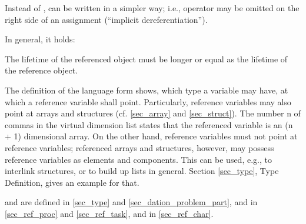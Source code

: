 Instead of , 
 can be written in a simpler way; i.e.,
operator  may be omitted on the right side of an assignment
(``implicit dereferentiation'').

In general, it holds:

\begin{grammarframe}
\end{grammarframe}

The lifetime of the referenced object must be longer or equal as
the lifetime of the reference object.

The definition of the language form  shows, which type a
variable may have, at which a reference variable shall point.
Particularly, reference variables may also point at arrays and
structures (cf. \ref{sec_array} and \ref{sec_struct}).
 The number n of commas in the virtual
dimension list states that the referenced variable is an (n + 1)
dimensional array. On the other hand, reference variables must not point
at reference variables; referenced arrays and structures, however, may
possess reference variables as elements and components. This can be
used, e.g., to interlink structures, or to build up lists in general.
Section \ref{sec_type}, Type Definition, gives an example for that.

 and  are defined in \ref{sec_type} and 
\ref{sec_dation_problem_part},  and 
 in \ref{sec_ref_proc} and \ref{sec_ref_task},
 and  in 
 \ref{sec_ref_char}.


